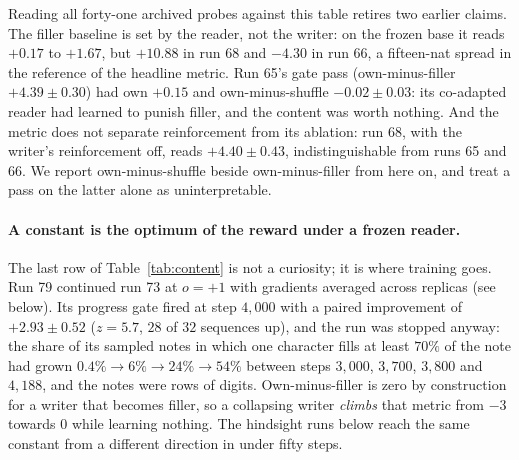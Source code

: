 \documentclass{article} %
\begin{document}
Reading all forty-one archived probes against this table retires two earlier claims. The filler baseline is
set by the reader, not the writer: on the frozen base it reads $+0.17$ to $+1.67$, but $+10.88$ in run 68 and
$-4.30$ in run 66, a fifteen-nat spread in the reference of the headline metric. Run 65's gate pass
(own-minus-filler $+4.39 \pm 0.30$) had own $+0.15$ and own-minus-shuffle $-0.02 \pm 0.03$: its co-adapted
reader had learned to punish filler, and the content was worth nothing. And the metric does not separate
reinforcement from its ablation: run 68, with the writer's reinforcement off, reads $+4.40 \pm 0.43$,
indistinguishable from runs 65 and 66. We report own-minus-shuffle beside own-minus-filler from here on, and
treat a pass on the latter alone as uninterpretable.

\paragraph{A constant is the optimum of the reward under a frozen reader.} The last row of
Table~\ref{tab:content} is not a curiosity; it is where training goes. Run 79 continued run 73 at $o=+1$ with
gradients averaged across replicas (see below). Its progress gate fired at step $4{,}000$ with a paired
improvement of $+2.93 \pm 0.52$ ($z = 5.7$, $28$ of $32$ sequences up), and the run was stopped anyway: the
share of its sampled notes in which one character fills at least $70\%$ of the note had grown
$0.4\% \to 6\% \to 24\% \to 54\%$ between steps $3{,}000$, $3{,}700$, $3{,}800$ and $4{,}188$, and the notes were
rows of digits. Own-minus-filler is zero by construction for a writer that becomes filler, so a collapsing
writer \emph{climbs} that metric from $-3$ towards $0$ while learning nothing. The hindsight runs below reach
the same constant from a different direction in under fifty steps.
\end{document}
